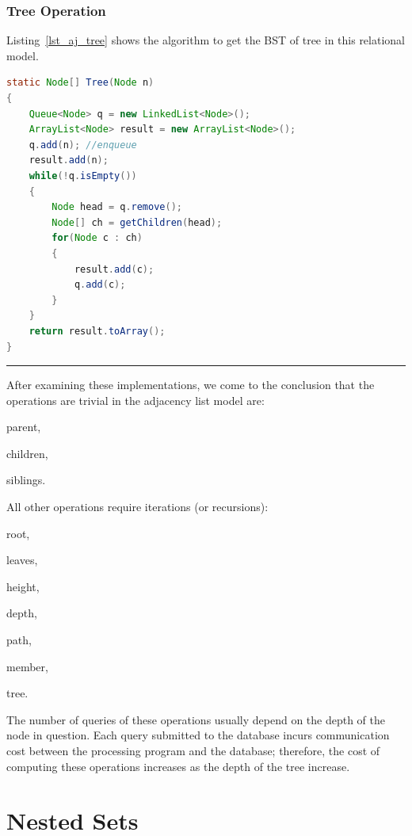 \subsubsection{Tree Operation}

Listing~\ref{lst_aj_tree} shows the algorithm to get the BST of tree in this relational model.

\begin{lstlisting}[language=java, style=java, caption=Tree via Adjacency List, label=lst_aj_tree]
static Node[] Tree(Node n)
{
    Queue<Node> q = new LinkedList<Node>();
    ArrayList<Node> result = new ArrayList<Node>();
    q.add(n); //enqueue
    result.add(n);
    while(!q.isEmpty())
    {
        Node head = q.remove();
        Node[] ch = getChildren(head);
        for(Node c : ch)
        {
            result.add(c);
            q.add(c);
        }
    }
    return result.toArray();
}
\end{lstlisting}

\rule{2cm}{0.5pt}

After examining these implementations, we come to the conclusion that the operations are trivial in the adjacency list model are:
\begin{inparaenum}[\itshape 1)]
\item parent,
\item children,
\item siblings.
\end{inparaenum}

All other operations require iterations (or recursions): \begin{inparaenum}[\itshape 1)]
\item root,
\item leaves,
\item height,
\item depth,
\item path,
\item member,
\item tree.
\end{inparaenum}
The number of queries of these operations usually depend on the depth of the node in question. Each query submitted to the database incurs communication cost between the processing program and the database; therefore, the cost of computing these operations increases as the depth of the tree increase.


\section{Nested Sets}\label{sec-nested-set}

